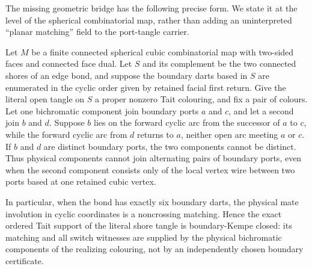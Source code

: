 The missing geometric bridge has the following precise form.  We state it at
the level of the spherical combinatorial map, rather than adding an
uninterpreted ``planar matching'' field to the port-tangle carrier.

\begin{theorem}
\label{thm:physical-kempe-components-noncrossing}
Let $M$ be a finite connected spherical cubic combinatorial map with
two-sided faces and connected face dual.  Let $S$ and its complement be the
two connected shores of an edge bond, and suppose the boundary darts based
in $S$ are enumerated in the cyclic order given by retained facial first
return.  Give the literal open tangle on $S$ a proper nonzero Tait
colouring, and fix a pair of colours.  Let one bichromatic component join
boundary ports $a$ and $c$, and let a second join $b$ and $d$.  Suppose
$b$ lies on the forward cyclic arc from the successor of $a$ to $c$, while
the forward cyclic arc from $d$ returns to $a$, neither open arc meeting
$a$ or $c$.  If $b$ and $d$ are distinct boundary ports, the two components
cannot be distinct.  Thus physical components cannot join alternating pairs
of boundary ports, even when the second component consists only of the local
vertex wire between two ports based at one retained cubic vertex.

In particular, when the bond has exactly six boundary darts, the physical
mate involution in cyclic coordinates is a noncrossing matching.  Hence the
exact ordered Tait support of the literal shore tangle is boundary-Kempe
closed: its matching and all switch witnesses are supplied by the physical
bichromatic components of the realizing colouring, not by an independently
chosen boundary certificate.
\end{theorem}

